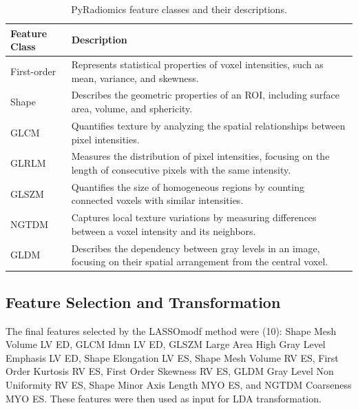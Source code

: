 \begin{table}[H]
	\centering
	\caption{PyRadiomics feature classes and their descriptions.}
	\begin{adjustbox}{width=0.99\textwidth}
		\begin{tabular}{p{3cm}p{15.5cm}}
			\hline
			\textbf{Feature Class} & \textbf{Description}                                                                                                    \\
			\hline
			First-order            & Represents statistical properties of voxel intensities, such as mean, variance, and skewness.                           \\
			Shape                  & Describes the geometric properties of an ROI, including surface area, volume, and sphericity.                           \\
			GLCM                   & Quantifies texture by analyzing the spatial relationships between pixel intensities.                                    \\
			GLRLM                  & Measures the distribution of pixel intensities, focusing on the length of consecutive pixels with the same intensity.   \\
			GLSZM                  & Quantifies the size of homogeneous regions by counting connected voxels with similar intensities.                       \\
			NGTDM                  & Captures local texture variations by measuring differences between a voxel intensity and its neighbors.                 \\
			GLDM                   & Describes the dependency between gray levels in an image, focusing on their spatial arrangement from the central voxel. \\
			\hline
		\end{tabular}
	\end{adjustbox}
	\label{tab:tab2}
\end{table}

\subsection{Feature Selection and Transformation}

The final features selected by the LASSOmodf method were (10): Shape Mesh
Volume LV ED, GLCM Idmn LV ED, GLSZM Large Area High Gray Level Emphasis LV ED,
Shape Elongation LV ES, Shape Mesh Volume RV ES, First Order Kurtosis RV ES,
First Order Skewness RV ES, GLDM Gray Level Non Uniformity RV ES, Shape Minor
Axis Length MYO ES, and NGTDM Coarseness MYO ES. These features were then used
as input for LDA transformation.

